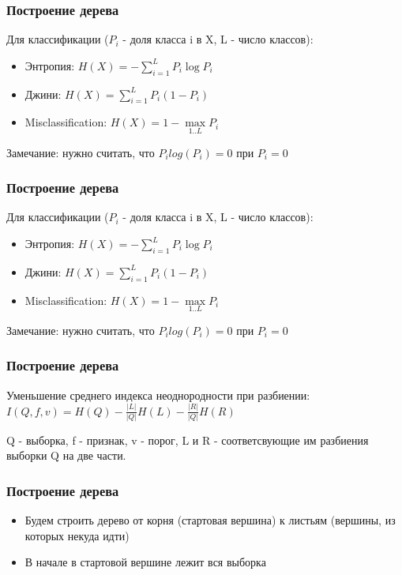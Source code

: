 \documentclass[14pt]{beamer}
\begin{document}
\begin{frame}
\frametitle{Построение дерева}

    Для классификации ($P_i$ - доля класса i в X, L - число классов):
    \begin {itemize}
    	\item Энтропия: $H(X) = -\sum\limits_{i=1}^{L} P_i \log{ P_i }$
    	\item Джини:  $H(X) = \sum\limits_{i=1}^{L} P_i (1 - P_i)$
    	\item Misclassification:   $H(X) = 1 - \max\limits_{1..L} P_i$
      \end {itemize}
      
    Замечание: нужно считать, что $P_i log(P_i) = 0$ при $P_i = 0$ 
\end{frame}

\begin{frame}
\frametitle{Построение дерева}

    Для классификации ($P_i$ - доля класса i в X, L - число классов):
    \begin {itemize}
    	\item Энтропия: $H(X) = -\sum\limits_{i=1}^{L} P_i \log{ P_i }$
    	\item Джини:  $H(X) = \sum\limits_{i=1}^{L} P_i (1 - P_i)$
    	\item Misclassification:   $H(X) = 1 - \max\limits_{1..L} P_i$
      \end {itemize}
      
    Замечание: нужно считать, что $P_i log(P_i) = 0$ при $P_i = 0$ 
\end{frame}

\begin{frame}
\frametitle{Построение дерева}

	\begin{rudef}
        Уменьшение среднего индекса неоднородности при разбиении:
        $I(Q, f, v) = H(Q) - \frac{|L|}{|Q|} H(L) - \frac{|R|}{|Q|} H(R)$
        
        
        Q - выборка, f - признак, v - порог, L и R - соответсвующие им разбиения выборки Q на две части.
    \end{rudef}
\end{frame}

\begin{frame}
\frametitle{Построение дерева}
	  \begin {itemize}
		\item Будем строить дерево от корня (стартовая вершина) к листьям (вершины, из которых некуда идти)
		\item В начале в стартовой вершине лежит вся выборка
	  \end {itemize}
\end{frame}
\end{document}
